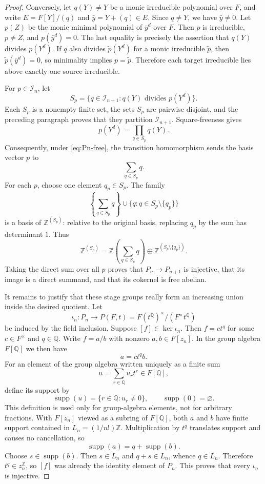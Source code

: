 \documentclass[11pt,a4paper]{article}
\numberwithin{equation}{section}
\theoremstyle{plain}
\theoremstyle{definition}
\theoremstyle{remark}
\newcommand{\Q}{\mathbb Q}
\newcommand{\Z}{\mathbb Z}
\begin{document}
\begin{proof}
Conversely, let $q(Y)\neq Y$ be a monic irreducible polynomial over $F$,
and write $E=F[Y]/(q)$ and $\bar y=Y+(q)\in E$.  Since $q\neq Y$, we have
$\bar y\neq0$.  Let $p(Z)$ be the monic minimal polynomial of $\bar y^d$
over $F$.  Then $p$ is irreducible, $p\neq Z$, and
$p(\bar y^d)=0$.  The last equality is precisely the assertion that
$q(Y)$ divides $p(Y^d)$.  If $q$ also divides $\widetilde p(Y^d)$ for a
monic irreducible $\widetilde p$, then
$\widetilde p(\bar y^d)=0$, so minimality implies
$p=\widetilde p$.  Therefore each target irreducible lies above exactly one
source irreducible.

For $p\in\mathcal I_n$, let
\[
  S_p=\{q\in\mathcal I_{n+1}:q(Y)\text{ divides }p(Y^d)\}.
\]
Each $S_p$ is a nonempty finite set, the sets $S_p$ are pairwise disjoint,
and the preceding paragraph proves that they partition
$\mathcal I_{n+1}$.  Square-freeness gives
\[
  p(Y^d)=\prod_{q\in S_p}q(Y).
\]
Consequently, under \cref{eq:Pn-free}, the transition homomorphism sends
the basis vector $p$ to
\begin{equation}\label{eq:transition-vector}
  \sum_{q\in S_p}q.
\end{equation}
For each $p$, choose one element $q_p\in S_p$.  The family
\[
  \left\{\sum_{q\in S_p}q\right\}
  \cup\{q:q\in S_p\setminus\{q_p\}\}
\]
is a basis of $\Z^{(S_p)}$: relative to the original basis, replacing
$q_p$ by the sum has determinant $1$.  Thus
\[
  \Z^{(S_p)}=
  \Z\left(\sum_{q\in S_p}q\right)
  \oplus\Z^{(S_p\setminus\{q_p\})}.
\]
Taking the direct sum over all $p$ proves that
$P_n\to P_{n+1}$ is injective, that its image is a direct summand, and that
its cokernel is free abelian.

It remains to justify that these stage groups really form an increasing
union inside the desired quotient.  Let
\[
  \iota_n:P_n\longrightarrow
  P(F,t)=F(t^\Q)^\times/(F^\times t^\Q)
\]
be induced by the field inclusion.  Suppose $[f]\in\ker\iota_n$.  Then
$f=c t^q$ for some $c\in F^\times$ and $q\in\Q$.  Write
$f=a/b$ with nonzero $a,b\in F[z_n]$.  In the group algebra $F[\Q]$ we
then have
\begin{equation}\label{eq:support-translation-puiseux}
  a=c t^q b.
\end{equation}
For an element of the group algebra written uniquely as a finite sum
\[
  u=\sum_{r\in\Q}u_r t^r\in F[\Q],
\]
define its support by
\[
  \operatorname{supp}(u)=\{r\in\Q:u_r\neq0\},
  \qquad \operatorname{supp}(0)=\varnothing.
\]
This definition is used only for group-algebra elements, not for arbitrary
fractions.  With $F[z_n]$ viewed as a subring of $F[\Q]$, both $a$ and $b$
have finite support contained in
$L_n=(1/n!)\Z$.  Multiplication by $t^q$ translates support and causes no
cancellation, so
\[
  \operatorname{supp}(a)=q+\operatorname{supp}(b).
\]
Choose $s\in\operatorname{supp}(b)$.  Then $s\in L_n$ and
$q+s\in L_n$, whence $q\in L_n$.  Therefore $t^q\in z_n^\Z$, so $[f]$ was
already the identity element of $P_n$.  This proves that every $\iota_n$
is injective.


\end{proof}
\end{document}
